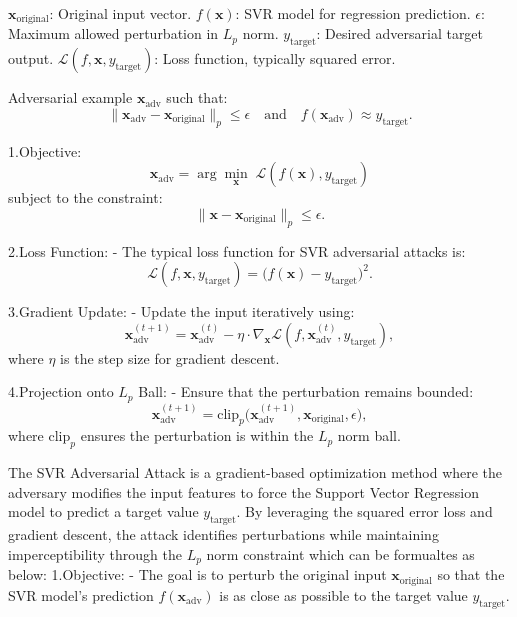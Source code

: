 
$\mathbf{x}_{\text{original}}$: Original input vector.
$f(\mathbf{x})$: SVR model for regression prediction.
$\epsilon$: Maximum allowed perturbation in $L_p$ norm.
$y_{\text{target}}$: Desired adversarial target output.
$\mathcal{L}(f, \mathbf{x}, y_{\text{target}})$: Loss function, typically squared error.

Adversarial example $\mathbf{x}_{\text{adv}}$ such that:
  \[
  \|\mathbf{x}_{\text{adv}} - \mathbf{x}_{\text{original}}\|_p \leq \epsilon \quad \text{and} \quad f(\mathbf{x}_{\text{adv}}) \approx y_{\text{target}}.
  \]

1.Objective:
   \[
   \mathbf{x}_{\text{adv}} = \arg \min_{\mathbf{x}} \; \mathcal{L}(f(\mathbf{x}), y_{\text{target}})
   \]
   subject to the constraint:
   \[
   \|\mathbf{x} - \mathbf{x}_{\text{original}}\|_p \leq \epsilon.
   \]

2.Loss Function:
   - The typical loss function for SVR adversarial attacks is:
     \[
     \mathcal{L}(f, \mathbf{x}, y_{\text{target}}) = \big(f(\mathbf{x}) - y_{\text{target}}\big)^2.
     \]

3.Gradient Update:
   - Update the input iteratively using:
     \[
     \mathbf{x}_{\text{adv}}^{(t+1)} = \mathbf{x}_{\text{adv}}^{(t)} - \eta \cdot \nabla_{\mathbf{x}} \mathcal{L}(f, \mathbf{x}_{\text{adv}}^{(t)}, y_{\text{target}}),
     \]
     where $\eta$ is the step size for gradient descent.

4.Projection onto $L_p$ Ball:
   - Ensure that the perturbation remains bounded:
     \[
     \mathbf{x}_{\text{adv}}^{(t+1)} = \text{clip}_p \big(\mathbf{x}_{\text{adv}}^{(t+1)}, \mathbf{x}_{\text{original}}, \epsilon \big),
     \]
     where $\text{clip}_p$ ensures the perturbation is within the $L_p$ norm ball.

The SVR Adversarial Attack is a gradient-based optimization method where the adversary modifies the input features to force the Support Vector Regression model to predict a target value $y_{\text{target}}$. By leveraging the squared error loss and gradient descent, the attack identifies perturbations while maintaining imperceptibility through the $L_p$ norm constraint which can be formualtes as below:
1.Objective:
   - The goal is to perturb the original input $\mathbf{x}_{\text{original}}$ so that the SVR model's prediction $f(\mathbf{x}_{\text{adv}})$ is as close as possible to the target value $y_{\text{target}}$.

